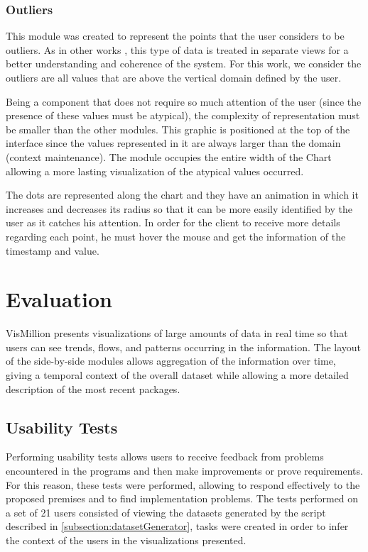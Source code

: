 \documentclass[letterpaper, 10 pt, conference]{ieeeconf}  %
\begin{document}
\subsubsection{Outliers}
\label{subsubsection:outliers}
This module was created to represent the points that the user considers to be outliers. As in other works \cite{4015444}, this type of data is treated in separate views for a better understanding and coherence of the system. For this work, we consider the outliers are all values that are above the vertical domain defined by the user.

Being a component that does not require so much attention of the user (since the presence of these values must be atypical), the complexity of representation must be smaller than the other modules. This graphic is positioned at the top of the interface since the values represented in it are always larger than the domain (context maintenance).
The module occupies the entire width of the Chart allowing a more lasting visualization of the atypical values occurred.

The dots are represented along the chart and they have an animation in which it increases and decreases its radius so that it can be more easily identified by the user as it catches his attention. In order for the client to receive more details regarding each point, he must hover the mouse and get the information of the timestamp and value.


\section{Evaluation}
\label{section:evaluation}

VisMillion presents visualizations of large amounts of data in real time so that users can see trends, flows, and patterns occurring in the information. The layout of the side-by-side modules allows aggregation of the information over time, giving a temporal context of the overall dataset while allowing a more detailed description of the most recent packages.

\subsection{Usability Tests}
\label{subsection:usability}
Performing usability tests allows users to receive feedback from problems encountered in the programs and then make improvements or prove requirements. For this reason, these tests were performed, allowing to respond effectively to the proposed premises and to find implementation problems. The tests performed on a set of 21 users consisted of viewing the datasets generated by the script described in \ref{subsection:datasetGenerator}, tasks were created in order to infer the context of the users in the visualizations presented.
\end{document}
